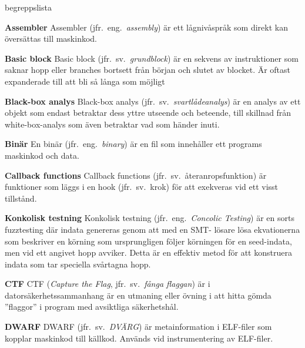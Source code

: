 \begin{labeling}{begreppslista}

    \item [\textbf{Assembler}] Assembler (jfr.\ eng.\ \emph{assembly}) är ett
    lågnivåspråk som direkt kan översättas till maskinkod.

    \item[\textbf{Basic block}] Basic block (jfr.\ sv.\ \emph{grundblock}) är en
    sekvens av instruktioner som saknar hopp eller branches bortsett från
    början och slutet av blocket. Är oftast expanderade till att bli så långa
    som möjligt

    \item [\textbf{Black-box analys}] Black-box analys (jfr.\ sv.\
    \emph{svartlådeanalys}) är en analys av ett objekt som endast betraktar dess
    yttre utseende och beteende, till skillnad från white-box-analys som även
    betraktar vad som händer inuti.

    \item [\textbf{Binär}] En binär (jfr.\ eng.\ \emph{binary}) är en fil som
    innehåller ett programs maskinkod och data.

    \item [\textbf{Callback functions}] Callback functions (jfr.\ sv.\
    återanropsfunktion) är funktioner som läggs i en hook (jfr.\ sv.\ krok) för
    att exekveras vid ett visst tillstånd.


    \item [\textbf{Konkolisk testning}] Konkolisk testning (jfr.\ eng.\ \emph{Concolic
        Testing}) är en sorts fuzztesting där indata genereras genom att med en SMT-
    lösare lösa ekvationerna som beskriver en körning som ursprungligen följer
    körningen för en seed-indata, men vid ett angivet hopp avviker. Detta är en
    effektiv metod för att konstruera indata som tar speciella svårtagna hopp.

    \item [\textbf{CTF}] CTF (\emph{Capture the Flag}, jfr.\ sv.\ \emph{fånga
        flaggan}) är i datorsäkerhetssammanhang är en utmaning eller övning i att
    hitta gömda ''flaggor'' i program med avsiktliga säkerhetshål.

    \item [\textbf{DWARF}] DWARF (jfr.\ sv.\ \emph{DVÄRG}) är metainformation i
    ELF-filer som kopplar maskinkod till källkod. Används vid instrumentering av
    ELF-filer.


\end{labeling}
